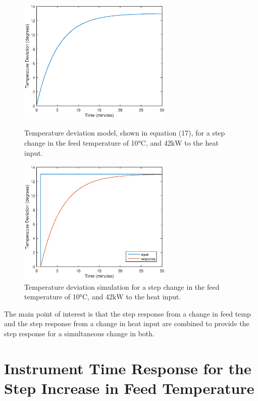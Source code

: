 \documentclass{article}
\begin{document}
\begin{figure}[h]
\begin{minipage}{0.45\textwidth}
\centering
\includegraphics[height=6cm]{1c_mod}
\caption{Temperature deviation model, shown in equation (17), for a step change in the feed temperature of 10$\si{\degreeCelsius}$, and 42$\si{\kilo\watt}$ to the heat input.}
\end{minipage}
\hspace{1cm}
\begin{minipage}{0.45\textwidth}
\centering
\includegraphics[height=6cm]{1c_sim}
\caption{Temperature deviation simulation for a step change in the feed temperature of 10$\si{\degreeCelsius}$, and 42$\si{\kilo\watt}$ to the heat input.}
\end{minipage}
\end{figure}

The main point of interest is that the step response from a change in feed temp and the step response from a change in heat input are combined to provide the step response for a simultaneous change in both. 


\section{Instrument Time Response for the Step Increase in Feed Temperature}
\end{document}
